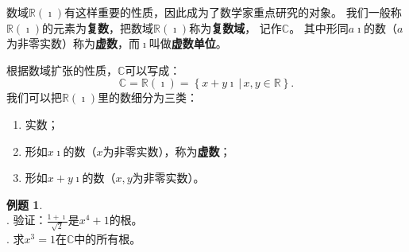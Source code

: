 \documentclass[12pt,UTF8]{ctexbook}
\theoremstyle{definition}
\newtheorem{et}{例题}[section]
\theoremstyle{plain}
\begin{document}
数域$\mathbb{R}(\imath)$有这样重要的性质，因此成为了数学家重点研究的对象。
我们一般称$\mathbb{R}(\imath)$的元素为\textbf{复数}，把数域$\mathbb{R}(\imath)$称为\textbf{复数域}，
记作$\mathbb{C}$。
其中形同$a\imath$的数（$a$为非零实数）称为\textbf{虚数}，而$\imath$叫做\textbf{虚数单位}。

根据数域扩张的性质，$\mathbb{C}$可以写成：
$$\mathbb{C} = \mathbb{R}(\imath) = \left\{\left. x + y\imath \, \right| \, x, y \in \mathbb{R} \right\}. $$
我们可以把$\mathbb{R}(\imath)$里的数细分为三类：
\begin{enumerate}
    \item 实数；
    \item 形如$x\imath$的数（$x$为非零实数），称为\textbf{虚数}；
    \item 形如$x + y\imath$的数（$x, y$为非零实数）。
\end{enumerate}

\begin{et}
    \mbox{} \\
    . 验证：$\displaystyle\frac{1 + \imath}{\sqrt{2}}$是$x^4 + 1$的根。\\
    . 求$x^3 = 1$在$\mathbb{C}$中的所有根。
    
\end{et}
\end{document}
